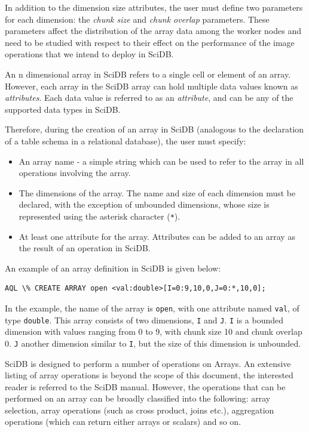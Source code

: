 \documentclass[tog]{acmsiggraph}
\begin{document}
In addition to the dimension size attributes, the user must define two
parameters for each dimension: the {\em chunk size} and {\em chunk overlap}
parameters. These parameters affect the distribution of the array data among
the worker nodes and need to be studied with respect to their effect on the
performance of the image operations that we intend to deploy in SciDB.

An n dimensional array in SciDB refers to a single cell or element of an
array. However, each array in the SciDB array can hold multiple data values
known as {\em attributes}. Each data value is referred to as an {\em
attribute}, and can be any of the supported data types in SciDB.

Therefore, during the creation of an array in SciDB (analogous to the
declaration of a table schema in a relational database), the user must specify:

\begin{itemize}
\item An array name - a simple string which can be used to refer to the array
in all operations involving the array.
\item The dimensions of the array. The name and size of each dimension must be
declared, with the exception of unbounded dimensions, whose size is represented
using the asterisk character (\texttt{*}).
\item At least one attribute for the array. Attributes can be added to an array
as the result of an operation in SciDB.
\end{itemize}

An example of an array definition in SciDB is given below:

\begin{lstlisting}[caption=Creating an Array in SciDB, frame=single]
AQL \% CREATE ARRAY open <val:double>[I=0:9,10,0,J=0:*,10,0];
\end{lstlisting}

In the example, the name of the array is \texttt{open}, with one attribute
named \texttt{val}, of type \texttt{double}. This array consists of two
dimensions, \texttt{I} and \texttt{J}. \texttt{I} is a bounded dimension with
values ranging from 0 to 9, with chunk size 10 and chunk overlap 0. \texttt{J}
another dimension similar to \texttt{I}, but the size of this dimension is
unbounded.

SciDB is designed to perform a number of operations on Arrays. An extensive
listing of array operations is beyond the scope of this document, the
interested reader is referred to the SciDB manual\cite{SciDBManual}. However,
the operations that can be performed on an array can be broadly classified into
the following: array selection, array operations (such as cross product, joins
etc.), aggregation operations (which can return either arrays or scalars) and
so on.
\end{document}
